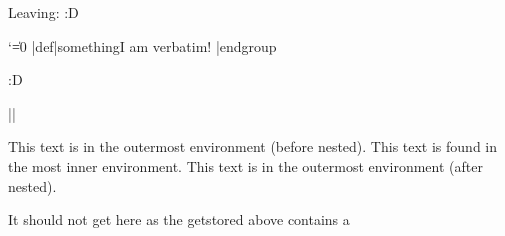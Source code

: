 



\scontents[store-env=another]
Leaving:
\bye :D
\endscontents

\scontents[store-env=test]
\begingroup
  \catcode`\|=0
  |def|something{I am verbatim!}
|endgroup
\something
\endscontents

\scontents[store-env=test]
\hello :D
\endscontents

\Scontents*{\abcde}
\Scontents*|\fghij|





\scontents[print-env=false, store-env=outer]
This text is in the outermost environment (before nested).
\scontents[print-env=false, store-env=inner]
This text is found in the most inner environment.
\endscontents
This text is in the outermost environment (after nested).
\endscontents


\par
{}\par




It should not get here as the getstored above contains a \bye
